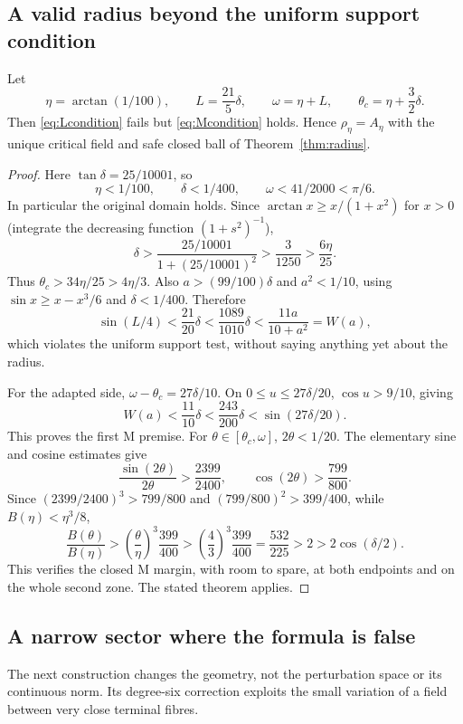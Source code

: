 \documentclass[11pt,a4paper]{article}
\begin{document}
\subsection{A valid radius beyond the uniform support condition}
\begin{example}\label{ex:M}
Let
\begin{equation}\label{eq:Mexample}
 \eta=\arctan(1/100),\qquad
 L=\frac{21}{5}\delta,\qquad
 \omega=\eta+L,\qquad \theta_c=\eta+\frac32\delta.
\end{equation}
Then \eqref{eq:Lcondition} fails but \eqref{eq:Mcondition}
holds. Hence $\rho_\eta=A_\eta$ with the unique critical field
and safe closed ball of Theorem~\ref{thm:radius}.
\end{example}
\begin{proof}
Here $\tan\delta=25/10001$, so
\[
 \eta<1/100,\qquad \delta<1/400,\qquad
 \omega<41/2000<\pi/6.
\]
In particular the original domain holds. Since
$\arctan x\ge x/(1+x^2)$ for $x>0$ (integrate the decreasing
function $(1+s^2)^{-1}$),
\[
 \delta>\frac{25/10001}{1+(25/10001)^2}
       >\frac{3}{1250}>\frac{6\eta}{25}.
\]
Thus $\theta_c>34\eta/25>4\eta/3$.
Also $a>(99/100)\delta$ and $a^2<1/10$, using
$\sin x\ge x-x^3/6$ and $\delta<1/400$. Therefore
\[
 \sin(L/4)<\frac{21}{20}\delta
       <\frac{1089}{1010}\delta
       <\frac{11a}{10+a^2}=W(a),
\]
which violates the uniform support test, without saying
anything yet about the radius.

For the adapted side, $\omega-\theta_c=27\delta/10$.
On $0\le u\le27\delta/20$, $\cos u>9/10$, giving
\[
 W(a)<\frac{11}{10}\delta
       <\frac{243}{200}\delta
       <\sin(27\delta/20).
\]
This proves the first M premise. For
$\theta\in[\theta_c,\omega]$, $2\theta<1/20$.
The elementary sine and cosine estimates give
\[
 \frac{\sin(2\theta)}{2\theta}>\frac{2399}{2400},
 \qquad \cos(2\theta)>\frac{799}{800}.
\]
Since $(2399/2400)^3>799/800$ and
$(799/800)^2>399/400$, while $B(\eta)<\eta^3/8$,
\[
 \frac{B(\theta)}{B(\eta)}
 >\left(\frac{\theta}{\eta}\right)^3\frac{399}{400}
 >\left(\frac43\right)^3\frac{399}{400}
 =\frac{532}{225}>2>2\cos(\delta/2).
\]
This verifies the closed M margin, with room to spare, at both
endpoints and on the whole second zone. The stated theorem applies.
\end{proof}

\subsection{A narrow sector where the formula is false}
The next construction changes the geometry, not the perturbation
space or its continuous norm. Its degree-six correction exploits
the small variation of a field between very close terminal fibres.
\end{document}
